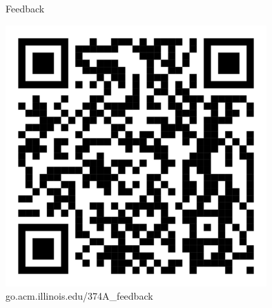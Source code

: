 \documentclass{beamer}
\begin{document}
\begin{frame}{Feedback}
    \begin{center}
       \includegraphics[height=10cm]{feedback.png}\\
    go.acm.illinois.edu/374A\_feedback 
    \end{center}
\end{frame}
\end{document}
